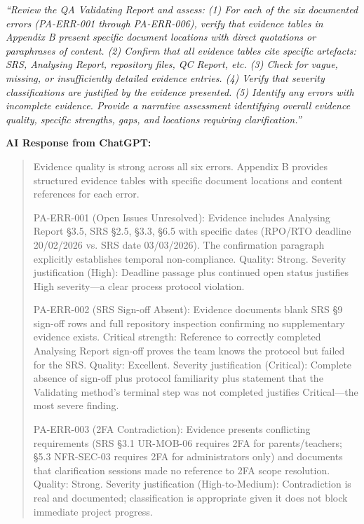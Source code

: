 \documentclass[11pt,a4paper]{article}
\begin{document}
\textit{``Review the QA Validating Report and assess: (1) For each of the six documented errors (PA-ERR-001 through PA-ERR-006), verify that evidence tables in Appendix B present specific document locations with direct quotations or paraphrases of content. (2) Confirm that all evidence tables cite specific artefacts: SRS, Analysing Report, repository files, QC Report, etc. (3) Check for vague, missing, or insufficiently detailed evidence entries. (4) Verify that severity classifications are justified by the evidence presented. (5) Identify any errors with incomplete evidence. Provide a narrative assessment identifying overall evidence quality, specific strengths, gaps, and locations requiring clarification.''}

\textbf{AI Response from ChatGPT:}

\begin{quote}
Evidence quality is strong across all six errors. Appendix B provides structured evidence tables with specific document locations and content references for each error.

PA-ERR-001 (Open Issues Unresolved): Evidence includes Analysing Report \S3.5, SRS \S2.5, \S3.3, \S6.5 with specific dates (RPO/RTO deadline 20/02/2026 vs. SRS date 03/03/2026). The confirmation paragraph explicitly establishes temporal non-compliance. Quality: Strong. Severity justification (High): Deadline passage plus continued open status justifies High severity---a clear process protocol violation.

PA-ERR-002 (SRS Sign-off Absent): Evidence documents blank SRS \S9 sign-off rows and full repository inspection confirming no supplementary evidence exists. Critical strength: Reference to correctly completed Analysing Report sign-off proves the team knows the protocol but failed for the SRS. Quality: Excellent. Severity justification (Critical): Complete absence of sign-off plus protocol familiarity plus statement that the Validating method's terminal step was not completed justifies Critical---the most severe finding.

PA-ERR-003 (2FA Contradiction): Evidence presents conflicting requirements (SRS \S3.1 UR-MOB-06 requires 2FA for parents/teachers; \S5.3 NFR-SEC-03 requires 2FA for administrators only) and documents that clarification sessions made no reference to 2FA scope resolution. Quality: Strong. Severity justification (High-to-Medium): Contradiction is real and documented; classification is appropriate given it does not block immediate project progress.


\end{quote}
\end{document}
